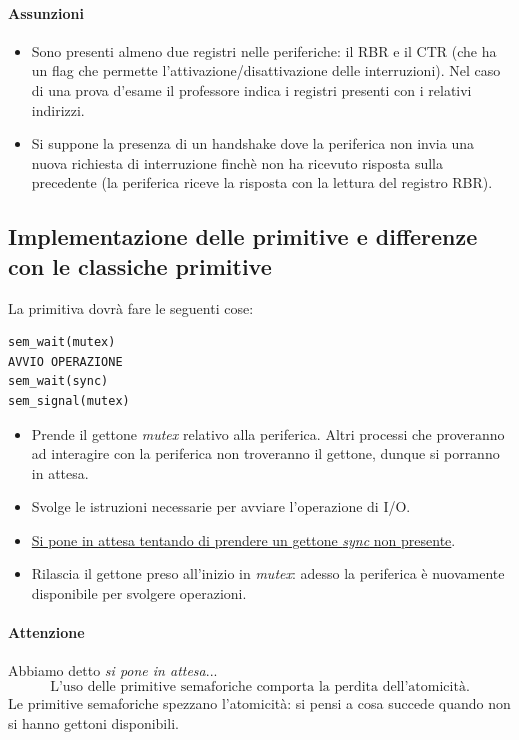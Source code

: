 \documentclass[11pt]{report}
\theoremstyle{definition}
\begin{document}
\paragraph{Assunzioni}
\begin{itemize}
	\item Sono presenti almeno due registri nelle periferiche: il RBR e il CTR (che ha un flag che permette l'attivazione/disattivazione delle interruzioni). Nel caso di una prova d'esame il professore indica i registri presenti con i relativi indirizzi.
	\item Si suppone la presenza di un handshake dove la periferica non invia una nuova richiesta di interruzione finchè non ha ricevuto risposta sulla precedente (la periferica riceve la risposta con la lettura del registro RBR).
\end{itemize}
\subsection{Implementazione delle primitive e differenze con le classiche primitive}
La primitiva dovrà fare le seguenti cose:
\begin{verbatim}
sem_wait(mutex)
AVVIO OPERAZIONE
sem_wait(sync)
sem_signal(mutex)
\end{verbatim}
\begin{itemize}
	\item Prende il gettone \emph{mutex} relativo alla periferica. Altri processi che proveranno ad interagire con la periferica non troveranno il gettone, dunque si porranno in attesa.
	\item Svolge le istruzioni necessarie per avviare l'operazione di I/O.
	\item \underline{Si pone in attesa tentando di prendere un gettone \emph{sync} non presente}.
	\item Rilascia il gettone preso all'inizio in \emph{mutex}: adesso la periferica è nuovamente disponibile per svolgere operazioni.
\end{itemize}
\paragraph{Attenzione} Abbiamo detto \textit{si pone in attesa}...\[\boxed{\text{L'uso delle primitive semaforiche comporta la perdita dell'atomicità.}}\]
Le primitive semaforiche spezzano l'atomicità: si pensi a cosa succede quando non si hanno gettoni disponibili.
\end{document}
